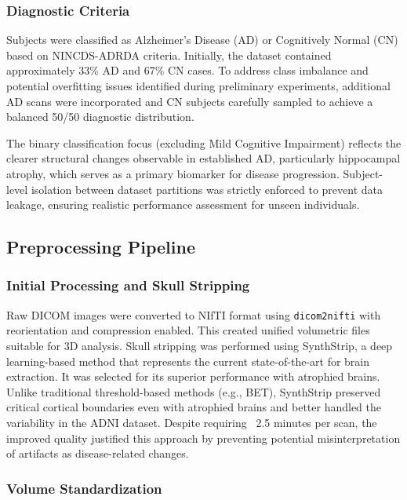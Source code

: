 \documentclass[12pt, a4paper]{article}
\begin{document}
\subsubsection{Diagnostic Criteria}

Subjects were classified as Alzheimer's Disease (AD) or Cognitively Normal (CN) based on NINCDS-ADRDA criteria. Initially, the dataset contained approximately 33\% AD and 67\% CN cases. To address class imbalance and potential overfitting issues identified during preliminary experiments, additional AD scans were incorporated and CN subjects carefully sampled to achieve a balanced 50/50 diagnostic distribution.

The binary classification focus (excluding Mild Cognitive Impairment) reflects the clearer structural changes observable in established AD, particularly hippocampal atrophy, which serves as a primary biomarker for disease progression. Subject-level isolation between dataset partitions was strictly enforced to prevent data leakage, ensuring realistic performance assessment for unseen individuals.

\subsection{Preprocessing Pipeline}

\subsubsection{Initial Processing and Skull Stripping}

Raw DICOM images were converted to NIfTI format using \texttt{dicom2nifti} with reorientation and compression enabled. This created unified volumetric files suitable for 3D analysis. Skull stripping was performed using SynthStrip, a deep learning-based method that represents the current state-of-the-art for brain extraction. It was selected for its superior performance with atrophied brains. Unlike traditional threshold-based methods (e.g., BET), SynthStrip preserved critical cortical boundaries even with atrophied brains and better handled the variability in the ADNI dataset. Despite requiring ~2.5 minutes per scan, the improved quality justified this approach by preventing potential misinterpretation of artifacts as disease-related changes.

\subsubsection{Volume Standardization}
\end{document}

